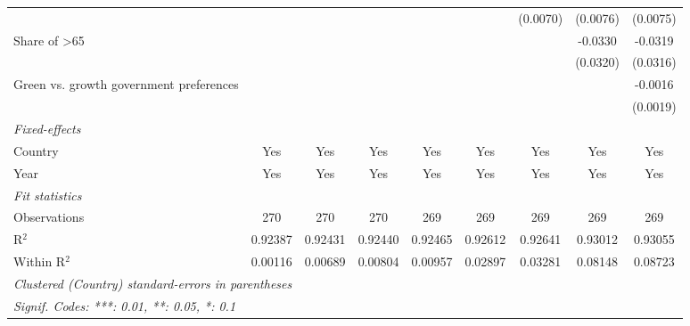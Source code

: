 \begin{table}[htbp]
\begin{tabular}{lcccccccc}
                                                    &          &          &          &          &          & (0.0070) & (0.0076) & (0.0075)\\   
      Share of >65                                  &          &          &          &          &          &          & -0.0330  & -0.0319\\   
                                                    &          &          &          &          &          &          & (0.0320) & (0.0316)\\   
      Green vs. growth government preferences       &          &          &          &          &          &          &          & -0.0016\\   
                                                    &          &          &          &          &          &          &          & (0.0019)\\   
      \midrule
      \emph{Fixed-effects}\\
      Country                                       & Yes      & Yes      & Yes      & Yes      & Yes      & Yes      & Yes      & Yes\\  
      Year                                          & Yes      & Yes      & Yes      & Yes      & Yes      & Yes      & Yes      & Yes\\  
      \midrule
      \emph{Fit statistics}\\
      Observations                                  & 270      & 270      & 270      & 269      & 269      & 269      & 269      & 269\\  
      R$^2$                                         & 0.92387  & 0.92431  & 0.92440  & 0.92465  & 0.92612  & 0.92641  & 0.93012  & 0.93055\\  
      Within R$^2$                                  & 0.00116  & 0.00689  & 0.00804  & 0.00957  & 0.02897  & 0.03281  & 0.08148  & 0.08723\\  
      \midrule \midrule
      \multicolumn{9}{l}{\emph{Clustered (Country) standard-errors in parentheses}}\\
      \multicolumn{9}{l}{\emph{Signif. Codes: ***: 0.01, **: 0.05, *: 0.1}}\\
   \end{tabular}
\end{table}


